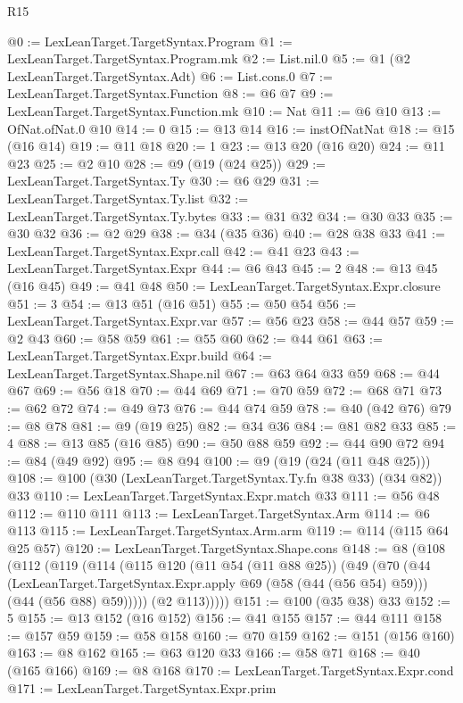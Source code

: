 \begin{lexlean}{R15}
\begin{coremodule}
@0 := LexLeanTarget.TargetSyntax.Program
@1 := LexLeanTarget.TargetSyntax.Program.mk
@2 := List.nil.{0}
@5 := @1 (@2 LexLeanTarget.TargetSyntax.Adt)
@6 := List.cons.{0}
@7 := LexLeanTarget.TargetSyntax.Function
@8 := @6 @7
@9 := LexLeanTarget.TargetSyntax.Function.mk
@10 := Nat
@11 := @6 @10
@13 := OfNat.ofNat.{0} @10
@14 := 0
@15 := @13 @14
@16 := instOfNatNat
@18 := @15 (@16 @14)
@19 := @11 @18
@20 := 1
@23 := @13 @20 (@16 @20)
@24 := @11 @23
@25 := @2 @10
@28 := @9 (@19 (@24 @25))
@29 := LexLeanTarget.TargetSyntax.Ty
@30 := @6 @29
@31 := LexLeanTarget.TargetSyntax.Ty.list
@32 := LexLeanTarget.TargetSyntax.Ty.bytes
@33 := @31 @32
@34 := @30 @33
@35 := @30 @32
@36 := @2 @29
@38 := @34 (@35 @36)
@40 := @28 @38 @33
@41 := LexLeanTarget.TargetSyntax.Expr.call
@42 := @41 @23
@43 := LexLeanTarget.TargetSyntax.Expr
@44 := @6 @43
@45 := 2
@48 := @13 @45 (@16 @45)
@49 := @41 @48
@50 := LexLeanTarget.TargetSyntax.Expr.closure
@51 := 3
@54 := @13 @51 (@16 @51)
@55 := @50 @54
@56 := LexLeanTarget.TargetSyntax.Expr.var
@57 := @56 @23
@58 := @44 @57
@59 := @2 @43
@60 := @58 @59
@61 := @55 @60
@62 := @44 @61
@63 := LexLeanTarget.TargetSyntax.Expr.build
@64 := LexLeanTarget.TargetSyntax.Shape.nil
@67 := @63 @64 @33 @59
@68 := @44 @67
@69 := @56 @18
@70 := @44 @69
@71 := @70 @59
@72 := @68 @71
@73 := @62 @72
@74 := @49 @73
@76 := @44 @74 @59
@78 := @40 (@42 @76)
@79 := @8 @78
@81 := @9 (@19 @25)
@82 := @34 @36
@84 := @81 @82 @33
@85 := 4
@88 := @13 @85 (@16 @85)
@90 := @50 @88 @59
@92 := @44 @90 @72
@94 := @84 (@49 @92)
@95 := @8 @94
@100 := @9 (@19 (@24 (@11 @48 @25)))
@108 := @100 (@30 (LexLeanTarget.TargetSyntax.Ty.fn @38 @33) (@34 @82)) @33
@110 := LexLeanTarget.TargetSyntax.Expr.match @33
@111 := @56 @48
@112 := @110 @111
@113 := LexLeanTarget.TargetSyntax.Arm
@114 := @6 @113
@115 := LexLeanTarget.TargetSyntax.Arm.arm
@119 := @114 (@115 @64 @25 @57)
@120 := LexLeanTarget.TargetSyntax.Shape.cons
@148 := @8
    (@108
      (@112
        (@119
          (@114
            (@115
              @120
              (@11 @54 (@11 @88 @25))
              (@49
                (@70
                  (@44
                    (LexLeanTarget.TargetSyntax.Expr.apply @69 (@58 (@44 (@56 @54) @59)))
                    (@44 (@56 @88) @59)))))
            (@2 @113)))))
@151 := @100 (@35 @38) @33
@152 := 5
@155 := @13 @152 (@16 @152)
@156 := @41 @155
@157 := @44 @111
@158 := @157 @59
@159 := @58 @158
@160 := @70 @159
@162 := @151 (@156 @160)
@163 := @8 @162
@165 := @63 @120 @33
@166 := @58 @71
@168 := @40 (@165 @166)
@169 := @8 @168
@170 := LexLeanTarget.TargetSyntax.Expr.cond
@171 := LexLeanTarget.TargetSyntax.Expr.prim

\end{coremodule}
\end{lexlean}
